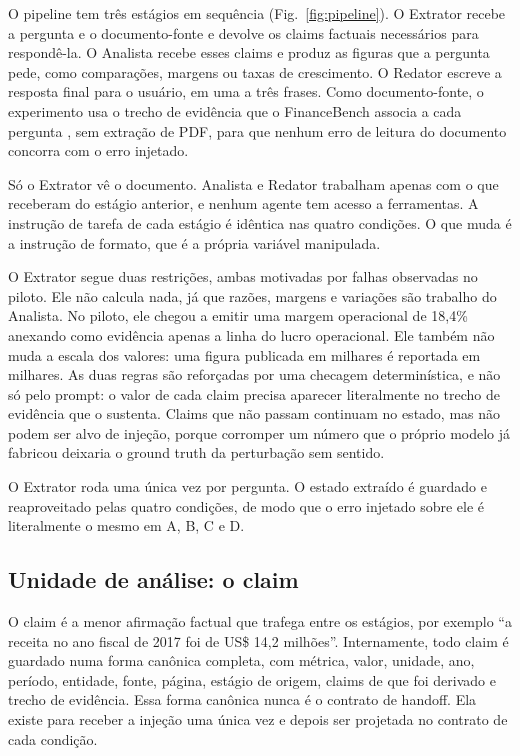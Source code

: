 O pipeline tem três estágios em sequência (Fig.~\ref{fig:pipeline}).
O Extrator recebe a pergunta e o documento-fonte e devolve os claims factuais necessários para respondê-la.
O Analista recebe esses claims e produz as figuras que a pergunta pede, como comparações, margens ou taxas de crescimento.
O Redator escreve a resposta final para o usuário, em uma a três frases.
Como documento-fonte, o experimento usa o trecho de evidência que o FinanceBench associa a cada pergunta \cite{islam2023financebench}, sem extração de PDF, para que nenhum erro de leitura do documento concorra com o erro injetado.

Só o Extrator vê o documento. Analista e Redator trabalham apenas com o que receberam do estágio anterior, e nenhum agente tem acesso a ferramentas.
A instrução de tarefa de cada estágio é idêntica nas quatro condições. O que muda é a instrução de formato, que é a própria variável manipulada.

O Extrator segue duas restrições, ambas motivadas por falhas observadas no piloto.
Ele não calcula nada, já que razões, margens e variações são trabalho do Analista. No piloto, ele chegou a emitir uma margem operacional de 18,4\% anexando como evidência apenas a linha do lucro operacional.
Ele também não muda a escala dos valores: uma figura publicada em milhares é reportada em milhares.
As duas regras são reforçadas por uma checagem determinística, e não só pelo prompt: o valor de cada claim precisa aparecer literalmente no trecho de evidência que o sustenta.
Claims que não passam continuam no estado, mas não podem ser alvo de injeção, porque corromper um número que o próprio modelo já fabricou deixaria o ground truth da perturbação sem sentido.

O Extrator roda uma única vez por pergunta.
O estado extraído é guardado e reaproveitado pelas quatro condições, de modo que o erro injetado sobre ele é literalmente o mesmo em A, B, C e D.

\subsection{Unidade de análise: o claim}\label{sec:claim}

O claim é a menor afirmação factual que trafega entre os estágios, por exemplo ``a receita no ano fiscal de 2017 foi de US\$ 14,2 milhões''.
Internamente, todo claim é guardado numa forma canônica completa, com métrica, valor, unidade, ano, período, entidade, fonte, página, estágio de origem, claims de que foi derivado e trecho de evidência.
Essa forma canônica nunca é o contrato de handoff. Ela existe para receber a injeção uma única vez e depois ser projetada no contrato de cada condição.

